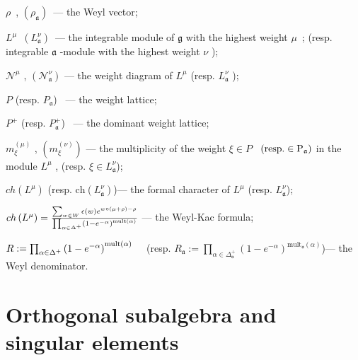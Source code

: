 \documentclass[12pt]{article}
\theoremstyle{definition}
\newcommand{\gf}{\mathfrak{g}}
\newcommand{\af}{\mathfrak{a}}
\begin{document}
$\rho $\ , $\left( \rho _{\af}\right) $\ --- the Weyl vector;

$L^{\mu }$\ $\left( L_{\af}^{\nu }\right) $\ --- the integrable module
of $\gf$ with the highest weight $\mu $\ ; (resp. integrable $\af$
-module with the highest weight $\nu $ );

$\mathcal{N}^{\mu }$ , $\left( \mathcal{N}_{\af}^{\nu }\right) $ ---
the weight diagram of $L^{\mu }$ (resp. ${}L_{\af}^{\nu }$ );

$P$ (resp. $P_{\af} $) \ --- the weight lattice;

$P^{+}$ (resp. $P_{\af}^{+} $) \ --- the dominant weight lattice;

$m_{\xi }^{\left( \mu \right) }$ , $\left( m_{\xi }^{\left( \nu \right)
}\right) $ --- the multiplicity of the weight $\xi \in P$ \ $\left( \mathrm{{%
resp. }\in P_{\af}}\right) $ in the module $L^{\mu }$ , (resp. $\xi \in
L_{\af}^{\nu } $);

$ch\left( L^{\mu }\right) $ (resp. $\mathrm{ch}\left( L_{\af}^{\nu
}\right) $)--- the formal character of $L^{\mu }$ (resp. $L_{\af}^{\nu
} $);

$ch\left( L^{\mu }\right) =\frac{\sum_{w\in W}\epsilon (w)e^{w\circ (\mu
+\rho )-\rho }}{\prod_{\alpha \in \Delta ^{+}}\left( 1-e^{-\alpha }\right) ^{%
\mathrm{{mult}\left( \alpha \right) }}}$ --- the Weyl-Kac formula;

$R:=\prod_{\alpha \in \Delta ^{+}}\left( 1-e^{-\alpha }\right) ^{\mathrm{{%
mult}\left( \alpha \right) }}\quad $ (resp. $R_{\af}:=\prod_{\alpha \in
\Delta _{\af}^{+}}\left( 1-e^{-\alpha }\right) ^{\mathrm{mult}_{\af%
}\left( \alpha \right) } $)--- the Weyl denominator.

\section{Orthogonal subalgebra and singular elements}

\label{sec:recurr-form-branch}
\end{document}
